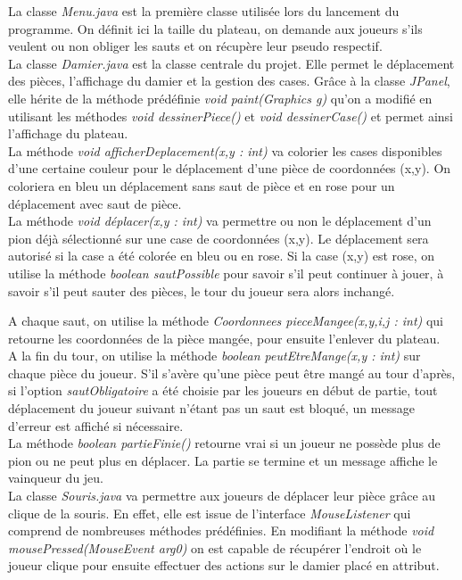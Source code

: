 \documentclass[12,french]{report}
\begin{document}
La classe \textit{Menu.java} est la première classe utilisée lors du lancement du programme. On définit ici la taille du plateau, on demande aux joueurs s'ils veulent ou non obliger les sauts et on récupère leur pseudo respectif.\\

La classe \textit{Damier.java} est la classe centrale du projet. Elle permet le déplacement des pièces, l'affichage du damier et la gestion des cases. Grâce à la classe \textit{JPanel}, elle hérite de la méthode prédéfinie \textit{void paint(Graphics g)} qu'on a modifié en utilisant les méthodes \textit{void dessinerPiece()} et \textit{void dessinerCase()} et permet ainsi l'affichage du plateau.\\

La méthode \textit{void afficherDeplacement(x,y : int)} va colorier les cases disponibles d'une certaine couleur pour le déplacement d'une pièce de coordonnées (x,y). On coloriera en bleu un déplacement sans saut de pièce et en rose pour un déplacement avec saut de pièce.\\

La méthode \textit{void déplacer(x,y : int)} va permettre ou non le déplacement d'un pion déjà sélectionné sur une case de coordonnées (x,y). Le déplacement sera autorisé si la case a été colorée en bleu ou en rose. Si la case (x,y) est rose, on utilise la méthode \textit{boolean sautPossible} pour savoir s'il peut continuer à jouer, à savoir s'il peut sauter des pièces, le tour du joueur sera alors inchangé.

A chaque saut, on utilise la méthode \textit{Coordonnees pieceMangee(x,y,i,j : int)} qui retourne les coordonnées de la pièce mangée, pour ensuite l'enlever du plateau.\\

A la fin du tour, on utilise la méthode \textit{boolean peutEtreMange(x,y : int)} sur chaque pièce du joueur. S'il s'avère qu'une pièce peut être mangé au tour d'après, si l'option \textit{sautObligatoire} a été choisie par les joueurs en début de partie, tout déplacement du joueur suivant n'étant pas un saut est bloqué, un message d'erreur est affiché si nécessaire.\\

La méthode \textit{boolean partieFinie()} retourne vrai si un joueur ne possède plus de pion ou ne peut plus en déplacer. La partie se termine et un message affiche le vainqueur du jeu.\\

La classe \textit{Souris.java} va permettre aux joueurs de déplacer leur pièce grâce au clique de la souris. En effet, elle est issue de l'interface \textit{MouseListener} qui comprend de nombreuses méthodes prédéfinies. En modifiant la méthode \textit{void mousePressed(MouseEvent arg0)} on est capable de récupérer l'endroit où le joueur clique pour ensuite effectuer des actions sur le damier placé en attribut.
\end{document}
